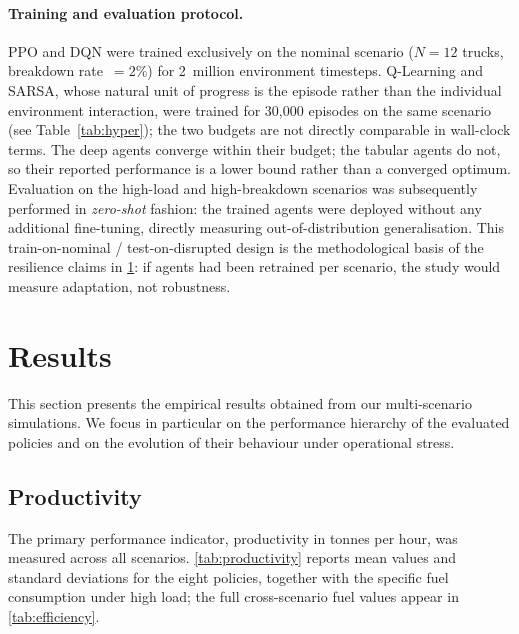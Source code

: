 \documentclass[11pt,a4paper]{article}
\begin{document}
\paragraph{Training and evaluation protocol.}
PPO and DQN were trained exclusively on the nominal scenario ($N=12$ trucks, breakdown rate~$=2\%$) for 2~million environment timesteps. Q-Learning and SARSA, whose natural unit of progress is the episode rather than the individual environment interaction, were trained for 30,000 episodes on the same scenario (see Table~\ref{tab:hyper}); the two budgets are not directly comparable in wall-clock terms. The deep agents converge within their budget; the tabular agents do not, so their reported performance is a lower bound rather than a converged optimum. Evaluation on the high-load and high-breakdown scenarios was subsequently performed in \textit{zero-shot} fashion: the trained agents were deployed without any additional fine-tuning, directly measuring out-of-distribution generalisation. This train-on-nominal / test-on-disrupted design is the methodological basis of the resilience claims in \cref{sec:results}: if agents had been retrained per scenario, the study would measure adaptation, not robustness. 
\section{Results}
\label{sec:results}

This section presents the empirical results obtained from our multi-scenario simulations. We focus in particular on the performance hierarchy of the evaluated policies and on the evolution of their behaviour under operational stress.

\subsection{Productivity}

The primary performance indicator, productivity in tonnes per hour, was measured across all scenarios. \cref{tab:productivity} reports mean values and standard deviations for the eight policies, together with the specific fuel consumption under high load; the full cross-scenario fuel values appear in \cref{tab:efficiency}.
\end{document}
